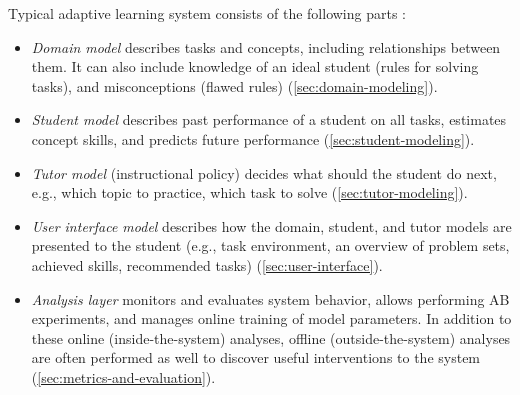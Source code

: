 \smallskip
Typical adaptive learning system consists of the following parts %
\cite{its-learner-models}:
\begin{itemize}
\item \emph{Domain model}
  describes tasks and concepts, including relationships between them.
  It can also include knowledge of an ideal student (rules for solving tasks),
  and misconceptions (flawed rules)
  (\cref{sec:domain-modeling}).
\item \emph{Student model} %
  describes past performance of a student on all tasks,
  estimates concept skills,
  and predicts future performance
  (\cref{sec:student-modeling}).
\item \emph{Tutor model}
  (instructional policy)
  decides what should the student do next,
  e.g., which topic to practice, which task to solve
  (\cref{sec:tutor-modeling}).
\item \emph{User interface model} %
  describes how the domain, student, and tutor models are presented to
  the student (e.g., task environment, an overview of problem sets, achieved
  skills, recommended tasks)
  (\cref{sec:user-interface}).
\item \emph{Analysis layer}
  monitors and evaluates system behavior,
  allows performing AB experiments,
  and manages online training of model parameters.
  In addition to these online (inside-the-system) analyses,
  offline (outside-the-system) analyses are often performed as well
  to discover useful interventions to the system  %
  (\cref{sec:metrics-and-evaluation}).
\end{itemize}



